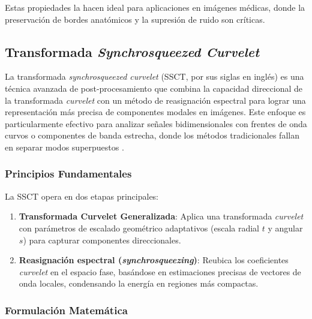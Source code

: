 Estas propiedades la hacen ideal para aplicaciones en imágenes médicas, donde la preservación de bordes anatómicos y la supresión de ruido son críticas.

\subsection{Transformada \textit{Synchrosqueezed Curvelet}}

La transformada \textit{synchrosqueezed curvelet} (SSCT, por sus siglas en inglés) es una técnica avanzada de post-procesamiento que combina la capacidad direccional de la transformada \textit{curvelet} con un método de reasignación espectral para lograr una representación más precisa de componentes modales en imágenes. Este enfoque es particularmente efectivo para analizar señales bidimensionales con frentes de onda curvos o componentes de banda estrecha, donde los métodos tradicionales fallan en separar modos superpuestos \cite{SynchrosqueezedCurveletTransform}.

\subsubsection{Principios Fundamentales}

La SSCT opera en dos etapas principales:
\begin{enumerate}
    \item \textbf{Transformada Curvelet Generalizada}: Aplica una transformada \textit{curvelet} con parámetros de escalado geométrico adaptativos (escala radial \(t\) y angular \(s\)) para capturar componentes direccionales.
    \item \textbf{Reasignación espectral (\textit{synchrosqueezing})}: Reubica los coeficientes \textit{curvelet} en el espacio fase, basándose en estimaciones precisas de vectores de onda locales, condensando la energía en regiones más compactas.
\end{enumerate}

\subsubsection{Formulación Matemática}

